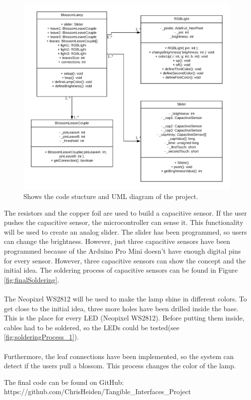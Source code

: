 \documentclass[04_projectProcess.tex]{subfiles}
\begin{document}
\begin{flushleft}
        \begin{figure}[H]
            \centering
            \includegraphics[width=0.8\linewidth]{images/programmingProcess/BlossomLamp_UML.png}
            \caption{Shows the code stucture and UML diagram of the project.}
            \label{fig:UMLDiagram}
        \end{figure}

        \noindent
        The resistors and the copper foil are used to build a capacitive sensor. \cite{Badger2019} 
        If the user pushes the capacitive sensor, the microcontroller can sense it. This functionality
        will be used to create an analog slider. The slider has been programmed, so users can change the 
        brightness. However, just three capacitive sensors have been programmed because of the Arduino 
        Pro Mini doesn't have enough digital pins for every sensor. However, three capacitive sensors can show 
        the concept and the initial idea. The soldering process of capacitive sensors can be found in 
        Figure \ref{fig:finalSoldering}. \\~\\

        \noindent
        The Neopixel WS2812 will be used to make the lamp shine in different colors. \cite{Burgess2019} 
        To get close to the initial idea, three more holes have been drilled inside the base. 
        This is the place for every LED (Neopixel WS2812). Before putting them inside, cables had to be 
        soldered, so the LEDs could be tested(see \ref{fig:solderingProcess_1}).\\~\\

        \noindent
        Furthermore, the leaf connections have been implemented, so the system can detect if 
        the users pull a blossom. This process changes the color of the lamp.

        \noindent
        The final code can be found on GitHub:  
        https://github.com/ChrisHeiden/Tangible\_Interfaces\_Project
    \end{flushleft}
\end{document}
